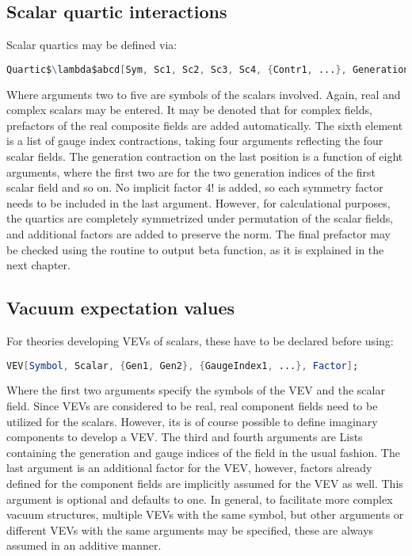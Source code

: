 \documentclass{scrartcl}
\begin{document}
\subsection{Scalar quartic interactions}
Scalar quartics may be defined via:
\begin{lstlisting}[language=mathematica,mathescape,columns=flexible,backgroundcolor=\color{light-gray}]
Quartic$\lambda$abcd[Sym, Sc1, Sc2, Sc3, Sc4, {Contr1, ...}, GenerationContr];
\end{lstlisting}
Where arguments two to five are symbols of the scalars involved. Again, real and complex scalars may be entered. It may be denoted that for complex fields, prefactors of the real composite fields are added automatically. The sixth element is a list of gauge index contractions, taking four arguments reflecting the four scalar fields. The generation contraction on the last position is a function of eight arguments, where the first two are for the two generation indices of the first scalar field and so on. \newline No implicit factor 4! is added, so each symmetry factor needs to be included in the last argument. However, for calculational purposes, the quartics are completely symmetrized under permutation of the scalar fields, and additional factors are added to preserve the norm. The final prefactor may be checked using the routine to output beta function, as it is explained in the next chapter.
\subsection{Vacuum expectation values}
For theories developing VEVs of scalars, these have to be declared before using:
\begin{lstlisting}[language=mathematica,mathescape,columns=flexible,backgroundcolor=\color{light-gray}]
VEV[Symbol, Scalar, {Gen1, Gen2}, {GaugeIndex1, ...}, Factor];
\end{lstlisting}
Where the first two arguments specify the symbols of the VEV and the scalar field. Since VEVs are considered to be real, real component fields need to be utilized for the scalars. However, its is of course possible to define imaginary components to develop a VEV. The third and fourth arguments are Lists containing the generation and gauge indices of the field in the usual fashion. The last argument is an additional factor for the VEV, however, factors already defined for the component fields are implicitly assumed for the VEV as well. This argument is optional and defaults to one. In general, to facilitate more complex vacuum structures, multiple VEVs with the same symbol, but other arguments or different VEVs with the same arguments may be specified, these are always assumed in an additive manner.
\newpage
\end{document}
